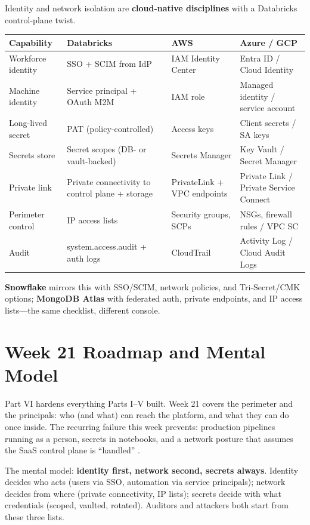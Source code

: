 \begin{crosscloud}
Identity and network isolation are \textbf{cloud-native disciplines} with a Databricks
control-plane twist.

\vspace{2mm}
{\footnotesize
\begin{tabular}{@{}p{3.0cm}p{3.4cm}p{3.2cm}p{3.2cm}@{}}
\toprule
\textbf{Capability} & \textbf{Databricks} & \textbf{AWS} & \textbf{Azure / GCP} \\
\midrule
Workforce identity & SSO + SCIM from IdP & IAM Identity Center & Entra ID / Cloud Identity \\
Machine identity & Service principal + OAuth M2M & IAM role & Managed identity / service account \\
Long-lived secret & PAT (policy-controlled) & Access keys & Client secrets / SA keys \\
Secrets store & Secret scopes (DB- or vault-backed) & Secrets Manager & Key Vault / Secret Manager \\
Private link & Private connectivity to control plane + storage & PrivateLink + VPC endpoints & Private Link / Private Service Connect \\
Perimeter control & IP access lists & Security groups, SCPs & NSGs, firewall rules / VPC SC \\
Audit & system.access.audit + auth logs & CloudTrail & Activity Log / Cloud Audit Logs \\
\bottomrule
\end{tabular}}

\vspace{1mm}
\textbf{Snowflake} mirrors this with SSO/SCIM, network policies, and Tri-Secret/CMK options;
\textbf{MongoDB Atlas} with federated auth, private endpoints, and IP access lists---the same
checklist, different console.
\end{crosscloud}

\section{Week 21 Roadmap and Mental Model}
Part VI hardens everything Parts I--V built. Week 21 covers the perimeter and the principals: who (and what) can reach the platform, and what they can do once inside. The recurring failure this week prevents: production pipelines running as a person, secrets in notebooks, and a network posture that assumes the SaaS control plane is ``handled'' \cite{databricksSecurity}.

The mental model: \textbf{identity first, network second, secrets always}. Identity decides who acts (users via SSO, automation via service principals); network decides from where (private connectivity, IP lists); secrets decide with what credentials (scoped, vaulted, rotated). Auditors and attackers both start from these three lists.

